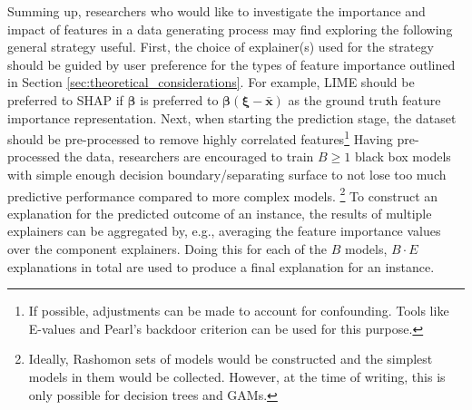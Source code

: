\documentclass[mnsc,blindrev]{informs3}
\begin{document}
            Summing up, researchers who would like to investigate the importance and impact of features in a data generating process may find exploring the following general strategy useful. First, the choice of explainer(s) used for the strategy should be guided by user preference for the types of feature importance outlined in Section \ref{sec:theoretical_considerations}. For example, LIME should be preferred to SHAP if $\boldsymbol{\beta}$ is preferred to $\boldsymbol{\beta}(\boldsymbol{\xi}-\bar{\mathbf{x}})$ as the ground truth feature importance representation.  %
            Next, when starting the prediction stage, the dataset should be pre-processed to remove highly correlated features\footnote{If possible, adjustments can be made to account for confounding. Tools like E-values\citep{gaster2023quantifying} and Pearl's backdoor criterion can be used for this purpose.}%
            Having pre-processed the data, researchers are encouraged to train $B\geq 1$ black box models with simple enough decision boundary/separating surface to not lose too much predictive performance compared to more complex models. \footnote{Ideally, Rashomon sets of models would be constructed and the simplest models in them would be collected. However, at the time of writing, this is only possible for decision trees and GAMs.} To construct an explanation for the predicted outcome of an instance, the results of multiple explainers can be aggregated by, e.g., averaging the feature importance values over the component explainers. Doing this for each of the $B$ models, $B\cdot E$ explanations in total are used to produce a final explanation for an instance.
            
            
\end{document}
